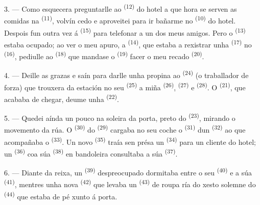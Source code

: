 3. --- Como esquecera preguntarlle ao  \textsuperscript{(12)} do
hotel a que hora se serven as comidas na  \textsuperscript{(11)},
volvín cedo e aproveitei para ir bañarme no 
\textsuperscript{(10)} do hotel. Despois fun outra vez á 
\textsuperscript{(15)} para telefonar a un dos meus amigos. Pero o 
\textsuperscript{(13)} estaba ocupado; ao ver o meu apuro, a 
\textsuperscript{(14)}, que estaba a rexistrar unha 
\textsuperscript{(17)} no  \textsuperscript{(16)},
pediulle ao  \textsuperscript{(18)} que mandase o 
\textsuperscript{(19)} facer o meu recado 
\textsuperscript{(20)}.

4. --- Deille as grazas e saín para darlle unha propina ao 
\textsuperscript{(24)} (o traballador de forza) que trouxera da estación no seu
 \textsuperscript{(25)} a miña 
\textsuperscript{(26)},  \textsuperscript{(27)} e  \textsuperscript{(28)}. O  \textsuperscript{(21)},
que acababa de chegar, deume unha  \textsuperscript{(22)}.

5. --- Quedei aínda un pouco na soleira da porta, preto do 
\textsuperscript{(23)}, mirando o movemento da rúa. O 
\textsuperscript{(30)} do  \textsuperscript{(29)} cargaba no seu coche
o  \textsuperscript{(31)} dun  \textsuperscript{(32)} ao
que acompañaba o  \textsuperscript{(33)}. Un novo
 \textsuperscript{(35)} traía sen présa un 
\textsuperscript{(34)} para un cliente do hotel; un 
\textsuperscript{(36)} coa súa  \textsuperscript{(38)}
en bandoleira consultaba a súa  \textsuperscript{(37)}.

\VUsaut{4.0mm}
\VUsaut{3.0mm}

6. --- Diante da reixa, un  \textsuperscript{(39)} despreocupado
dormitaba entre o seu  \textsuperscript{(40)} e a súa
 \textsuperscript{(41)}, mentres unha nova
 \textsuperscript{(42)} que levaba un 
\textsuperscript{(43)} de roupa ría do xesto solemne do 
\textsuperscript{(44)} que estaba de pé xunto á porta.

